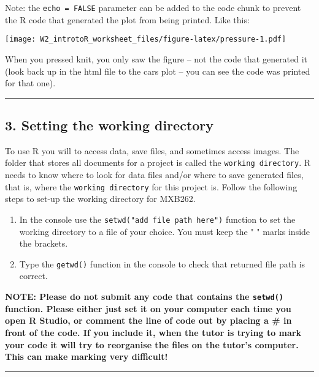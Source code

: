 \documentclass[]{article}
\providecommand{\tightlist}{%
  \setlength{\itemsep}{0pt}\setlength{\parskip}{0pt}}
\begin{document}
Note: the \texttt{echo\ =\ FALSE} parameter can be added to the code
chunk to prevent the R code that generated the plot from being printed.
Like this:

\texttt{[image: W2\_introtoR\_worksheet\_files/figure-latex/pressure-1.pdf]}

When you pressed knit, you only saw the figure -- not the code that
generated it (look back up in the html file to the cars plot -- you can
see the code was printed for that one).

\begin{center}\rule{0.5\linewidth}{\linethickness}\end{center}

\hypertarget{setting-the-working-directory}{%
\subsection{3. Setting the working
directory}\label{setting-the-working-directory}}

To use R you will to access data, save files, and sometimes access
images. The folder that stores all documents for a project is called the
\texttt{working\ directory}. R needs to know where to look for data
files and/or where to save generated files, that is, where the
\texttt{working\ directory} for this project is. Follow the following
steps to set-up the working directory for MXB262.

\begin{enumerate}
\def\labelenumi{\arabic{enumi}.}
\tightlist
\item
  In the console use the \texttt{setwd("add\ file\ path\ here")}
  function to set the working directory to a file of your choice. You
  must keep the " " marks inside the brackets.
\item
  Type the \texttt{getwd()} function in the console to check that
  returned file path is correct.
\end{enumerate}

\textbf{NOTE: Please do not submit any code that contains the
\texttt{setwd()} function. Please either just set it on your computer
each time you open R Studio, or comment the line of code out by placing
a \# in front of the code. If you include it, when the tutor is trying
to mark your code it will try to reorganise the files on the tutor's
computer. This can make marking very difficult!}

\begin{center}\rule{0.5\linewidth}{\linethickness}\end{center}
\end{document}
